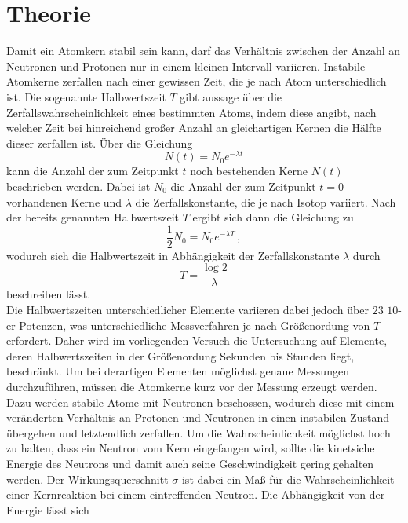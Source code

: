 \section{Theorie}
\label{sec:Theorie}

Damit ein Atomkern stabil sein kann, darf das Verhältnis zwischen der Anzahl an Neutronen und Protonen nur in einem 
kleinen Intervall variieren. Instabile Atomkerne zerfallen nach einer gewissen Zeit, die je nach Atom unterschiedlich ist.
Die sogenannte Halbwertszeit $T$ gibt aussage über die Zerfallswahrscheinlichkeit eines bestimmten Atoms, indem diese angibt,
nach welcher Zeit bei hinreichend großer Anzahl an gleichartigen Kernen die Hälfte dieser zerfallen ist. Über die Gleichung 
\begin{equation}
    N(t) = N_0 e^{-\lambda t}
    \label{eqn:nt}
\end{equation}
kann die Anzahl der zum Zeitpunkt $t$ noch bestehenden Kerne $N(t)$ beschrieben werden. Dabei ist $N_0$ die Anzahl der zum 
Zeitpunkt $t=0$ vorhandenen Kerne und $\lambda$ die Zerfallskonstante, die je nach Isotop variiert. Nach der bereits genannten 
Halbwertszeit $T$ ergibt sich dann die Gleichung zu 
\begin{equation}
    \frac{1}{2}N_0 = N_0 e^{-\lambda T}\,,
\end{equation}
wodurch sich die Halbwertszeit in Abhängigkeit der Zerfallskonstante $\lambda$ durch 
\begin{equation}
    T = \frac{\log{2}}{\lambda}
    \label{eqn:T}
\end{equation}
beschreiben lässt.
\\
Die Halbwertszeiten unterschiedlicher Elemente variieren dabei jedoch über $23$ $10$-er Potenzen, was unterschiedliche 
Messverfahren je nach Größenordung von $T$ erfordert. Daher wird im vorliegenden Versuch die Untersuchung auf Elemente, deren 
Halbwertszeiten in der Größenordung Sekunden bis Stunden liegt, beschränkt. Um bei derartigen Elementen möglichst genaue Messungen
durchzuführen, müssen die Atomkerne kurz vor der Messung erzeugt werden. Dazu werden stabile Atome mit Neutronen beschossen, 
wodurch diese mit einem veränderten Verhältnis an Protonen und Neutronen in einen instabilen Zustand übergehen und letztendlich
zerfallen. Um die Wahrscheinlichkeit möglichst hoch zu halten, dass ein Neutron vom Kern eingefangen wird, sollte die kinetsiche
Energie des Neutrons und damit auch seine Geschwindigkeit gering gehalten werden. Der Wirkungsquerschnitt $\sigma$ ist dabei ein
Maß für die Wahrscheinlichkeit einer Kernreaktion bei einem eintreffenden Neutron. Die Abhängigkeit von der Energie lässt sich 
